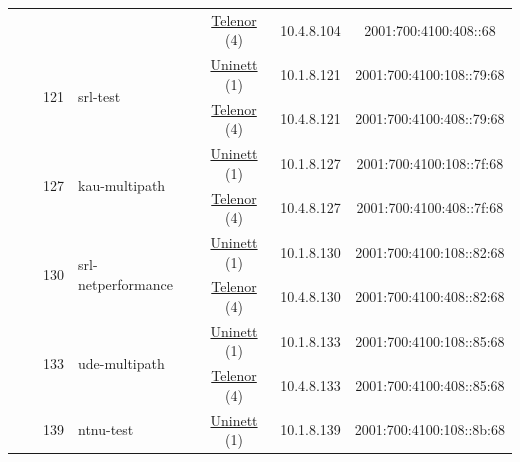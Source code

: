 \begin{small}
\begin{center}
\begin{longtable}{|c|c|c|c|c|c|c|c|}
  &  & \multicolumn{2}{|c|}{} & \multicolumn{2}{|c|}{\tiny{\href{https://www.telenor.no}{Telenor} (4)}} & \tiny{10.4.8.104} & \tiny{2001:700:4100:408::68} \\* \cline{3-3}\cline{4-4}\cline{5-5}\cline{6-6}\cline{7-7}\cline{8-8}
  &  & \multirow{2}{*}{\tiny{121}} & \multicolumn{1}{|l|}{\multirow{2}{*}{\tiny{srl-test}}} & \multicolumn{2}{|c|}{\tiny{\href{https://www.uninett.no}{Uninett} (1)}} & \tiny{10.1.8.121} & \tiny{2001:700:4100:108::79:68} \\* \cline{5-5}\cline{6-6}\cline{7-7}\cline{8-8}
  &  &  &  & \multicolumn{2}{|c|}{\tiny{\href{https://www.telenor.no}{Telenor} (4)}} & \tiny{10.4.8.121} & \tiny{2001:700:4100:408::79:68} \\* \cline{3-3}\cline{4-4}\cline{5-5}\cline{6-6}\cline{7-7}\cline{8-8}
  &  & \multirow{2}{*}{\tiny{127}} & \multicolumn{1}{|l|}{\multirow{2}{*}{\tiny{kau-multipath}}} & \multicolumn{2}{|c|}{\tiny{\href{https://www.uninett.no}{Uninett} (1)}} & \tiny{10.1.8.127} & \tiny{2001:700:4100:108::7f:68} \\* \cline{5-5}\cline{6-6}\cline{7-7}\cline{8-8}
  &  &  &  & \multicolumn{2}{|c|}{\tiny{\href{https://www.telenor.no}{Telenor} (4)}} & \tiny{10.4.8.127} & \tiny{2001:700:4100:408::7f:68} \\* \cline{3-3}\cline{4-4}\cline{5-5}\cline{6-6}\cline{7-7}\cline{8-8}
  &  & \multirow{2}{*}{\tiny{130}} & \multicolumn{1}{|l|}{\multirow{2}{*}{\tiny{srl-netperformance}}} & \multicolumn{2}{|c|}{\tiny{\href{https://www.uninett.no}{Uninett} (1)}} & \tiny{10.1.8.130} & \tiny{2001:700:4100:108::82:68} \\* \cline{5-5}\cline{6-6}\cline{7-7}\cline{8-8}
  &  &  &  & \multicolumn{2}{|c|}{\tiny{\href{https://www.telenor.no}{Telenor} (4)}} & \tiny{10.4.8.130} & \tiny{2001:700:4100:408::82:68} \\* \cline{3-3}\cline{4-4}\cline{5-5}\cline{6-6}\cline{7-7}\cline{8-8}
  &  & \multirow{2}{*}{\tiny{133}} & \multicolumn{1}{|l|}{\multirow{2}{*}{\tiny{ude-multipath}}} & \multicolumn{2}{|c|}{\tiny{\href{https://www.uninett.no}{Uninett} (1)}} & \tiny{10.1.8.133} & \tiny{2001:700:4100:108::85:68} \\* \cline{5-5}\cline{6-6}\cline{7-7}\cline{8-8}
  &  &  &  & \multicolumn{2}{|c|}{\tiny{\href{https://www.telenor.no}{Telenor} (4)}} & \tiny{10.4.8.133} & \tiny{2001:700:4100:408::85:68} \\* \cline{3-3}\cline{4-4}\cline{5-5}\cline{6-6}\cline{7-7}\cline{8-8}
  &  & \multirow{2}{*}{\tiny{139}} & \multicolumn{1}{|l|}{\multirow{2}{*}{\tiny{ntnu-test}}} & \multicolumn{2}{|c|}{\tiny{\href{https://www.uninett.no}{Uninett} (1)}} & \tiny{10.1.8.139} & \tiny{2001:700:4100:108::8b:68} \\* \cline{5-5}\cline{6-6}\cline{7-7}\cline{8-8}

\end{longtable}
\end{center}
\end{small}
